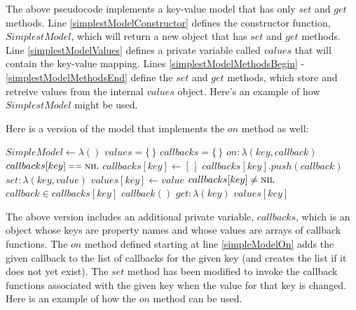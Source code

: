 The above pseudocode implements a key-value model that has only $set$ and $get$ methods. Line \ref{simplestModelConstructor} defines the constructor function, $SimplestModel$, which will return a new object that has $set$ and $get$ methods. Line \ref{simplestModelValues} defines a private variable called $values$ that will contain the key-value mapping. Lines \ref{simplestModelMethodsBegin} - \ref{simplestModelMethodsEnd} define the $set$ and $get$ methods, which store and retreive values from the internal $values$ object. Here's an example of how $SimplestModel$ might be used.


Here is a version of the model that implements the $on$ method as well:

\begin{codebox}
\li $SimpleModel \gets \lambda()$ \label{simpleModelConstructor}
\Do
  \li $values = \{\,\}$ \label{simpleModelValues}
  \li $callbacks = \{\,\}$ \label{simpleModelCallbacks}
  \li \Return \label{simpleModelMethodsBegin}
  \Do
    \li $on: \lambda(key, callback)$ \label{simpleModelOn}
    \Do
      \li \If $callbacks[key] \isequal \const{nil}$
      \Do
        \li $callbacks[key] \gets [\,]$
      \End
      \li $callbacks[key].push(callback)$
    \End
    \li $set: \lambda(key, value)$
    \Do
      \li $values[key] \gets value$
      \li \If $callbacks[key] \neq \textnormal{\scshape nil}$
      \Do
        \li \For $callback \in callbacks[key]$
        \Do
          \li $callback()$
        \End  
      \End
    \End
    \li $get: \lambda(key)$ \Return $values[key]$
  \End
\End
\end{codebox}

The above version includes an additional private variable, $callbacks$, which is an object whose keys are property names and whose values are arrays of callback functions. The $on$ method defined starting at line \ref{simpleModelOn} adds the given callback to the list of callbacks for the given key (and creates the list if it does not yet exist). The $set$ method has been modified to invoke the callback functions associated with the given key when the value for that key is changed. Here is an example of how the $on$ method can be used.


